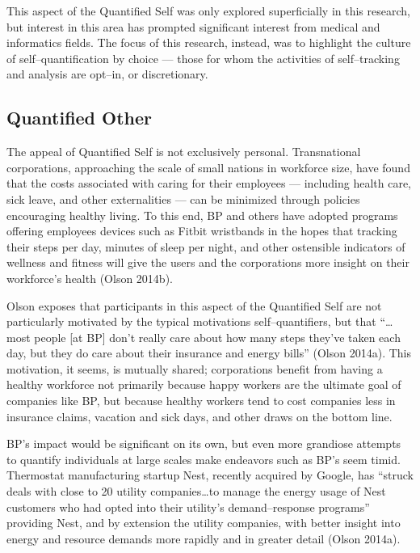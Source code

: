 \documentclass{article}
\begin{document}
This aspect of the Quantified Self was only explored superficially in this research,
but interest in this area has prompted significant interest from medical and informatics fields.
The focus of this research,
instead,
was to highlight the culture of self--quantification by choice
--- those for whom the activities of self--tracking and analysis are opt--in,
or discretionary.

\subsection*{Quantified Other}
The appeal of Quantified Self is not exclusively personal.
Transnational corporations,
approaching the scale of small nations in workforce size,
have found that the costs associated with caring for their employees
--- including health care,
sick leave,
and other externalities
--- can be minimized through policies encouraging healthy living.
To this end,
BP and others have adopted programs offering employees devices such as Fitbit wristbands in the hopes that tracking their steps per day,
minutes of sleep per night,
and other ostensible indicators of wellness and fitness will give the users and the corporations more insight on their workforce's health
(Olson 2014b). 

Olson exposes that participants in this aspect of the Quantified Self are not particularly motivated by the typical motivations self--quantifiers,
but that ``\dots most people [at BP] don't really care about how many steps they've taken each day,
but they do care about their insurance and energy bills''
(Olson 2014a). 
This motivation,
it seems,
is mutually shared;
corporations benefit from having a healthy workforce not primarily because happy workers are the ultimate goal of companies like BP,
but because healthy workers tend to cost companies less in insurance claims,
vacation and sick days,
and other draws on the bottom line.

BP's impact would be significant on its own,
but even more grandiose attempts to quantify individuals at large scales make endeavors such as BP's seem timid.
Thermostat manufacturing startup Nest,
recently acquired by Google,
has ``struck deals with close to 20 utility companies\dots to manage the energy usage of Nest customers who had opted into their utility's demand--response programs'' providing Nest,
and by extension the utility companies,
with better insight into energy and resource demands more rapidly and in greater detail
(Olson 2014a). 
\end{document}
